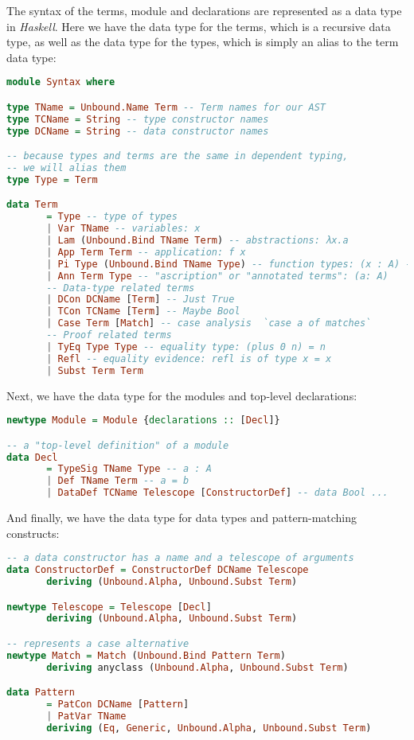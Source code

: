 The syntax of the terms, module and declarations are represented as a data type in \emph{Haskell}.
Here we have the data type for the terms, which is a recursive data type, as well as the data type for the types, which is simply an alias to the term data type:

\begin{lstlisting}[language=Haskell]
module Syntax where

type TName = Unbound.Name Term -- Term names for our AST
type TCName = String -- type constructor names
type DCName = String -- data constructor names

-- because types and terms are the same in dependent typing,
-- we will alias them
type Type = Term

data Term
       = Type -- type of types
       | Var TName -- variables: x
       | Lam (Unbound.Bind TName Term) -- abstractions: λx.a
       | App Term Term -- application: f x
       | Pi Type (Unbound.Bind TName Type) -- function types: (x : A) -> B
       | Ann Term Type -- "ascription" or "annotated terms": (a: A)
       -- Data-type related terms
       | DCon DCName [Term] -- Just True
       | TCon TCName [Term] -- Maybe Bool
       | Case Term [Match] -- case analysis  `case a of matches`
       -- Proof related terms
       | TyEq Type Type -- equality type: (plus 0 n) = n
       | Refl -- equality evidence: refl is of type x = x
       | Subst Term Term
\end{lstlisting}
Next, we have the data type for the modules and top-level declarations:
\begin{lstlisting}[language=Haskell]
newtype Module = Module {declarations :: [Decl]}

-- a "top-level definition" of a module
data Decl
       = TypeSig TName Type -- a : A
       | Def TName Term -- a = b
       | DataDef TCName Telescope [ConstructorDef] -- data Bool ...
\end{lstlisting}
And finally, we have the data type for data types and pattern-matching constructs:
\begin{lstlisting}[language=Haskell]
-- a data constructor has a name and a telescope of arguments
data ConstructorDef = ConstructorDef DCName Telescope
       deriving (Unbound.Alpha, Unbound.Subst Term)

newtype Telescope = Telescope [Decl]
       deriving (Unbound.Alpha, Unbound.Subst Term)

-- represents a case alternative
newtype Match = Match (Unbound.Bind Pattern Term)
       deriving anyclass (Unbound.Alpha, Unbound.Subst Term)

data Pattern
       = PatCon DCName [Pattern]
       | PatVar TName
       deriving (Eq, Generic, Unbound.Alpha, Unbound.Subst Term)
\end{lstlisting}

